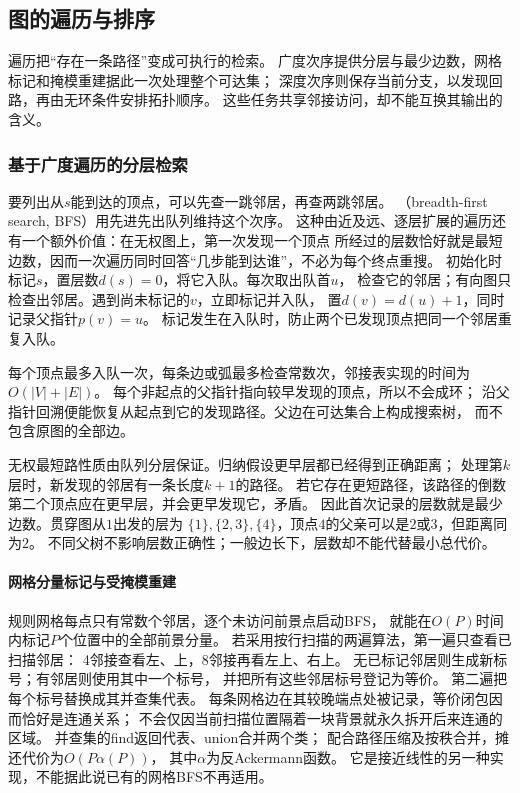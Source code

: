 \subsection{图的遍历与排序}

遍历把“存在一条路径”变成可执行的检索。
广度次序提供分层与最少边数，网格标记和掩模重建据此一次处理整个可达集；
深度次序则保存当前分支，以发现回路，再由无环条件安排拓扑顺序。
这些任务共享邻接访问，却不能互换其输出的含义。

\subsubsection{基于广度遍历的分层检索}
\label{sec:graph-theory-bfs}

要列出从\(s\)能到达的顶点，可以先查一跳邻居，再查两跳邻居。
（breadth-first search, BFS）用先进先出队列维持这个次序。
这种由近及远、逐层扩展的遍历还有一个额外价值：在无权图上，第一次发现一个顶点
所经过的层数恰好就是最短边数，因而一次遍历同时回答“几步能到达谁”，不必为每个终点重搜。
初始化时标记\(s\)，置层数\(d(s)=0\)，将它入队。每次取出队首\(u\)，
检查它的邻居；有向图只检查出邻居。遇到尚未标记的\(v\)，立即标记并入队，
置\(d(v)=d(u)+1\)，同时记录父指针\(p(v)=u\)。
标记发生在入队时，防止两个已发现顶点把同一个邻居重复入队。

每个顶点最多入队一次，每条边或弧最多检查常数次，邻接表实现的时间为
\(O(|V|+|E|)\)。
每个非起点的父指针指向较早发现的顶点，所以不会成环；
沿父指针回溯便能恢复从起点到它的发现路径。父边在可达集合上构成搜索树，
而不包含原图的全部边。

无权最短路性质由队列分层保证。归纳假设更早层都已经得到正确距离；
处理第\(k\)层时，新发现的邻居有一条长度\(k+1\)的路径。
若它存在更短路径，该路径的倒数第二个顶点应在更早层，并会更早发现它，矛盾。
因此首次记录的层数就是最少边数。贯穿图从\(1\)出发的层为
\(\{1\},\{2,3\},\{4\}\)，顶点\(4\)的父亲可以是\(2\)或\(3\)，但距离同为\(2\)。
不同父树不影响层数正确性；一般边长下，层数却不能代替最小总代价。

\paragraph{网格分量标记与受掩模重建}
规则网格每点只有常数个邻居，逐个未访问前景点启动BFS，
就能在$O(P)$时间内标记$P$个位置中的全部前景分量。
若采用按行扫描的两遍算法，第一遍只查看已扫描邻居：
4邻接查看左、上，8邻接再看左上、右上。
无已标记邻居则生成新标号；有邻居则使用其中一个标号，
并把所有这些邻居标号登记为等价。
第二遍把每个标号替换成其并查集代表。
每条网格边在其较晚端点处被记录，等价闭包因而恰好是连通关系；
不会仅因当前扫描位置隔着一块背景就永久拆开后来连通的区域。
并查集的find返回代表、union合并两个类；
配合路径压缩及按秩合并，摊还代价为$O(P\alpha(P))$，
其中$\alpha$为反Ackermann函数。
它是接近线性的另一种实现，不能据此说已有的网格BFS不再适用。

